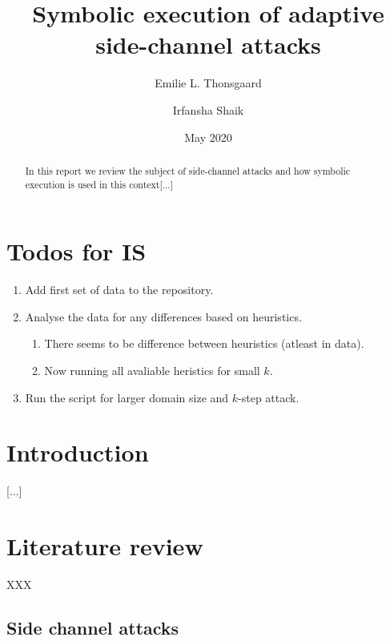 \documentclass[11pt,a4paper,notitlepage]{article}
\title{Symbolic execution of adaptive side-channel attacks}
\author{Emilie L. Thonsgaard \and Irfansha Shaik}
\date{May 2020}
\begin{document}
\begin{titlingpage}
    \maketitle
    \begin{abstract}
        In this report we review the subject of side-channel attacks and how symbolic execution is used in this context[...]
    \end{abstract}
\end{titlingpage}

\tableofcontents
\newpage
\setcounter{section}{-1}


\section{Todos for IS}
\label{sec:todosforis}

\begin{enumerate}
  \item Add first set of data to the repository.
  \item Analyse the data for any differences based on heuristics.
  \begin{enumerate}
    \item There seems to be difference between heuristics (atleast in data).
    \item Now running all avaliable heristics for small $k$.
  \end{enumerate}
  \item Run the script for larger domain size and $k$-step attack.
\end{enumerate}

\newpage

\section{Introduction}
\label{cha:introduction}

[...]

\newpage

\section{Literature review}
\label{cha:literaturereview}

XXX

\subsection{Side channel attacks}
\label{sec:sidechannelattacks}
\end{document}
